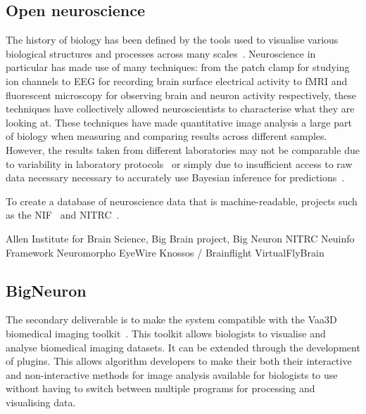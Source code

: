 \subsection{Open neuroscience}
The history of biology has been defined by the tools used to
visualise various biological structures and processes across many
scales~\cite{moore2012visualizing}. Neuroscience in particular has
made use of many techniques: from the patch clamp for studying ion
channels to \acrshort{EEG} for recording brain surface electrical
activity to \acrshort{fMRI} and fluorescent microscopy for
observing brain and neuron activity respectively, these techniques
have collectively allowed neuroscientists to characterise what
they are looking at.  These techniques have made quantitative
image analysis a large part of biology when measuring and
comparing results across different samples. However, the results
taken from different laboratories may not be comparable due to
variability in laboratory protocols~\autocite{NeuroMorphVariability:Parekh:2015}
or simply due to insufficient access to raw data necessary
necessary to accurately use Bayesian inference for
predictions~\autocite{Poldrack2011}.

To create a database of neuroscience data that is machine-readable, projects such as
the \acrfull{NIF}~\cite{Gardner2008} and \acrfull{NITRC}~\cite{Kennedy2016}.

Allen Institute for Brain Science,
Big Brain project,
Big Neuron
NITRC
Neuinfo  Framework
Neuromorpho
EyeWire
Knossos / Brainflight
VirtualFlyBrain
~\autocite{Helmstaedter2012}
~\autocite{NeuroDebian:Halchenko:2012}

\subsection{BigNeuron}\label{subsec:bigneuron}

{ %
	The secondary deliverable is to make the system compatible
	with the Vaa3D biomedical imaging toolkit~\autocite{Vaa3D:site:2015,Vaa3D:Peng:2010,Vaa3D:Peng:2014}.
	This toolkit allows biologists to visualise and analyse
	biomedical imaging datasets. It can be extended through
	the development of plugins. This allows algorithm
	developers to make their both their interactive and
	non-interactive methods for image analysis available
	for biologists to use without having to switch between
	multiple programs for processing and visualising data.
}

